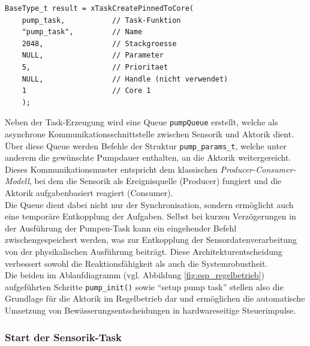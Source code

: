 \begin{lstlisting}[style=cstyle, caption={Start der Pump-Task}, label={lst:pump_task}]
	BaseType_t result = xTaskCreatePinnedToCore(
	pump_task,           // Task-Funktion
	"pump_task",         // Name
	2048,                // Stackgroesse
	NULL,                // Parameter
	5,                   // Prioritaet
	NULL,                // Handle (nicht verwendet)
	1                    // Core 1
	);
\end{lstlisting}
\vspace{1em}
\noindent Neben der Task-Erzeugung wird eine Queue \texttt{pumpQueue} erstellt, welche als asynchrone Kommunikationsschnittstelle zwischen Sensorik und Aktorik dient. Über diese Queue werden Befehle der Struktur \texttt{pump\_params\_t}, welche unter anderem die gewünschte Pumpdauer enthalten, an die Aktorik weitergereicht. Dieses Kommunikationsmuster entspricht dem klassischen \textit{Producer-Consumer-Modell}, bei dem die Sensorik als Ereignisquelle (Producer) fungiert und die Aktorik aufgabenbasiert reagiert (Consumer).
\\
Die Queue dient dabei nicht nur der Synchronisation, sondern ermöglicht auch eine temporäre Entkopplung der Aufgaben. Selbst bei kurzen Verzögerungen in der Ausführung der Pumpen-Task kann ein eingehender Befehl zwischengespeichert werden, was zur Entkopplung der Sensordatenverarbeitung von der physikalischen Ausführung beiträgt. Diese Architekturentscheidung verbessert sowohl die Reaktionsfähigkeit als auch die Systemrobustheit.
\\
Die beiden im Ablaufdiagramm (vgl. Abbildung \vref{fig:esp_regelbetrieb}) aufgeführten Schritte \texttt{pump\_init()} sowie \enquote{setup pump task} stellen also die Grundlage für die Aktorik im Regelbetrieb dar und ermöglichen die automatische Umsetzung von Bewässerungsentscheidungen in hardwareseitige Steuerimpulse.

\subsubsection{Start der Sensorik-Task}

